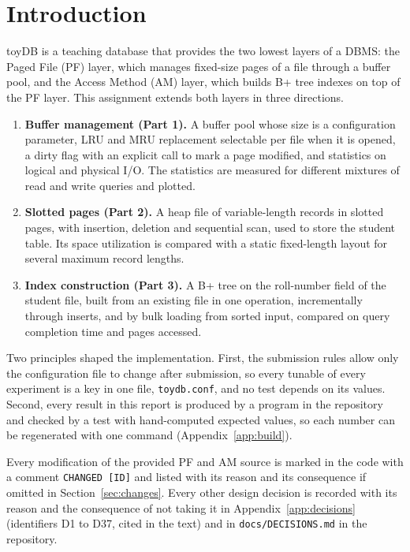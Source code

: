 \documentclass[11pt,a4paper]{article}
\begin{document}
\section{Introduction}

toyDB is a teaching database that provides the two lowest layers of a DBMS: the Paged File (PF) layer, which manages fixed-size pages of a file through a buffer pool, and the Access Method (AM) layer, which builds B+ tree indexes on top of the PF layer. This assignment extends both layers in three directions.

\begin{enumerate}
\item \textbf{Buffer management (Part 1).} A buffer pool whose size is a configuration parameter, LRU and MRU replacement selectable per file when it is opened, a dirty flag with an explicit call to mark a page modified, and statistics on logical and physical I/O. The statistics are measured for different mixtures of read and write queries and plotted.
\item \textbf{Slotted pages (Part 2).} A heap file of variable-length records in slotted pages, with insertion, deletion and sequential scan, used to store the student table. Its space utilization is compared with a static fixed-length layout for several maximum record lengths.
\item \textbf{Index construction (Part 3).} A B+ tree on the roll-number field of the student file, built from an existing file in one operation, incrementally through inserts, and by bulk loading from sorted input, compared on query completion time and pages accessed.
\end{enumerate}

Two principles shaped the implementation. First, the submission rules allow only the configuration file to change after submission, so every tunable of every experiment is a key in one file, \texttt{toydb.conf}, and no test depends on its values. Second, every result in this report is produced by a program in the repository and checked by a test with hand-computed expected values, so each number can be regenerated with one command (Appendix~\ref{app:build}).

Every modification of the provided PF and AM source is marked in the code with a comment \texttt{CHANGED [ID]} and listed with its reason and its consequence if omitted in Section~\ref{sec:changes}. Every other design decision is recorded with its reason and the consequence of not taking it in Appendix~\ref{app:decisions} (identifiers D1 to D37, cited in the text) and in \texttt{docs/DECISIONS.md} in the repository.
\end{document}
